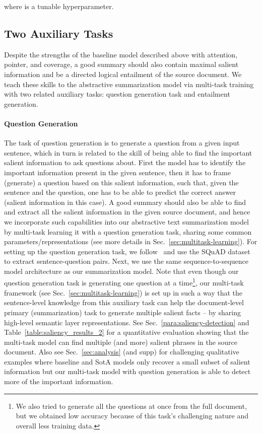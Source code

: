 \documentclass[11pt,a4paper]{article}
\begin{document}
where  is a tunable hyperparameter.

\subsection{Two Auxiliary Tasks}
Despite the strengths of the baseline model described above with attention, pointer, and coverage, a good summary should also contain maximal salient information and be a directed logical entailment of the source document. We teach these skills to the abstractive summarization model via multi-task training with two related auxiliary tasks: question generation task and entailment generation.
\paragraph{Question Generation}
\label{paragraph:question-generation}
The task of question generation is to generate a question from a given input sentence, which in turn is related to the skill of being able to find the important salient information to ask questions about. First the model has to identify the important information present in the given sentence, then it has to frame (generate) a question based on this salient information, such that, given the sentence and the question, one has to be able to predict the correct answer (salient information in this case). A good summary should also be able to find and extract all the salient information in the given source document, and hence we incorporate such capabilities into our abstractive text summarization model by multi-task learning it with a question generation task, sharing some common parameters/representations (see more details in Sec.~\ref{sec:multitask-learning}).
For setting up the question generation task, we follow~ and use the SQuAD dataset to extract sentence-question pairs. Next, we use the same sequence-to-sequence model architecture as our summarization model. 
Note that even though our question generation task is generating one question at a time\footnote{We also tried to generate all the questions at once from the full document, but we obtained low accuracy because of this task's challenging nature and overall less training data.}, our multi-task framework (see Sec.~\ref{sec:multitask-learning}) is set up in such a way that the sentence-level knowledge from this auxiliary task can help the document-level primary (summarization) task to generate multiple salient facts -- by sharing high-level semantic layer representations. See Sec.~\ref{para:saliency-detection} and Table~\ref{table:saliency_results_2} for a quantitative evaluation showing that the multi-task model can find multiple (and more) salient phrases in the source document. Also see Sec.~\ref{sec:analysis} (and supp) for challenging qualitative examples where baseline and SotA models only recover a small subset of salient information but our multi-task model with question generation is able to detect more of the important information.
\end{document}
